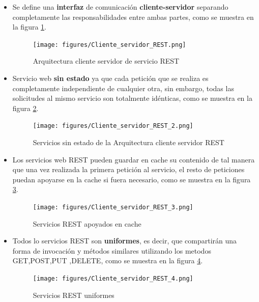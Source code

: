 \begin{itemize}
    \item Se define una \textbf{interfaz} de comunicación \textbf{cliente-servidor} separando completamente las responsabilidades entre ambas partes, como se muestra en la figura \ref{arquitectura_REST_1}.
    
    \begin{figure}[!ht]
    	\centering
    	\texttt{[image: figures/Cliente\_servidor\_REST.png]} %
        \caption{Arquitectura cliente servidor de servicio REST} %
        \label{arquitectura_REST_1}
    \end{figure}
    
    \item Servicio web \textbf{sin estado} ya que  cada petición que se realiza es completamente independiente de cualquier otra, sin embargo, todas las solicitudes al mismo servicio son totalmente idénticas, como se muestra en la figura \ref{arquitectura_REST_2}.
    
    \begin{figure}[!ht]
    	\centering
    	\texttt{[image: figures/Cliente\_servidor\_REST\_2.png]} %
        \caption{Servicios sin estado de la Arquitectura cliente servidor REST} %
        \label{arquitectura_REST_2}
    \end{figure}
    
    \item Los servicios web REST pueden guardar en cache su contenido de tal manera que una vez realizada la primera petición al servicio, el resto de peticiones puedan apoyarse en la cache si fuera necesario, como se muestra en la figura \ref{arquitectura_REST_3}.
    
    \begin{figure}[!ht]
    	\centering
    	\texttt{[image: figures/Cliente\_servidor\_REST\_3.png]} %
        \caption{Servicios REST apoyados en cache} %
        \label{arquitectura_REST_3}
    \end{figure}
    
    \item Todos lo servicios REST son \textbf{uniformes}, es decir, que compartirán una forma de invocación y métodos similares utilizando los metodos GET,POST,PUT ,DELETE, como se muestra en la figura \ref{arquitectura_REST_4}.
    
    \begin{figure}[!ht]
    	\centering
    	\texttt{[image: figures/Cliente\_servidor\_REST\_4.png]} %
        \caption{Servicios REST uniformes} %
        \label{arquitectura_REST_4}
    \end{figure}
    

\end{itemize}
